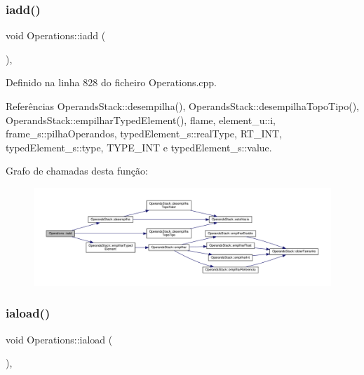 \subsubsection{\texorpdfstring{iadd()}{iadd()}}
{\footnotesize\ttfamily void Operations\+::iadd (\begin{DoxyParamCaption}{ }\end{DoxyParamCaption})\hspace{0.3cm}{\ttfamily [static]}, {\ttfamily [private]}}



Definido na linha 828 do ficheiro Operations.\+cpp.



Referências Operands\+Stack\+::desempilha(), Operands\+Stack\+::desempilha\+Topo\+Tipo(), Operands\+Stack\+::empilhar\+Typed\+Element(), flame, element\+\_\+u\+::i, frame\+\_\+s\+::pilha\+Operandos, typed\+Element\+\_\+s\+::real\+Type, R\+T\+\_\+\+I\+NT, typed\+Element\+\_\+s\+::type, T\+Y\+P\+E\+\_\+\+I\+NT e typed\+Element\+\_\+s\+::value.

Grafo de chamadas desta função\+:
\nopagebreak
\begin{figure}[H]
\begin{center}
\leavevmode
\includegraphics[width=350pt]{classOperations_a12d5933f0d0c91c578b76edb1971a2be_cgraph}
\end{center}
\end{figure}
\mbox{\label{classOperations_a77f3b4c161fee7fbd6bb89b170400c0c}} 
\subsubsection{\texorpdfstring{iaload()}{iaload()}}
{\footnotesize\ttfamily void Operations\+::iaload (\begin{DoxyParamCaption}{ }\end{DoxyParamCaption})\hspace{0.3cm}{\ttfamily [static]}, {\ttfamily [private]}}



